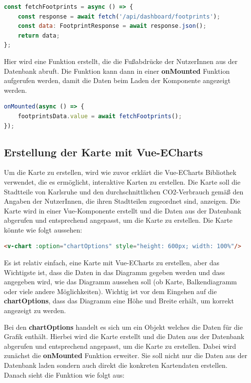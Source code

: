 \begin{lstlisting}[language={JavaScript}, caption={Laden der Fußabdrücke der NutzerInnen}]
const fetchFootprints = async () => {
    const response = await fetch('/api/dashboard/footprints');
    const data: FootprintResponse = await response.json();
    return data;
};
\end{lstlisting}

Hier wird eine Funktion erstellt, die die Fußabdrücke der NutzerInnen aus der Datenbank abruft. Die Funktion kann dann in einer \textbf{onMounted} Funktion aufgerufen werden, damit die Daten beim Laden der Komponente angezeigt werden.

\begin{lstlisting}[language={JavaScript}, caption={Bei laden der Komponente die Fußabdrücke der NutzerInnen speichern}]
onMounted(async () => {
    footprintsData.value = await fetchFootprints();
});
\end{lstlisting}

\subsection{Erstellung der Karte mit Vue-ECharts}

Um die Karte zu erstellen, wird wie zuvor erklärt die Vue-ECharts Bibliothek verwendet, die es ermöglicht, interaktive Karten zu erstellen. Die Karte soll die Stadtteile von Karlsruhe und den durchschnittlichen CO2-Verbrauch gemäß den Angaben der NutzerInnen, die ihren Stadtteilen zugeordnet sind, anzeigen. Die Karte wird in einer Vue-Komponente erstellt und die Daten aus der Datenbank abgerufen und entsprechend angepasst, um die Karte zu erstellen. Die Karte könnte wie folgt aussehen:

\begin{lstlisting}[language={html}, caption={Vue-ECharts Diagramm Beispiel}]
<v-chart :option="chartOptions" style="height: 600px; width: 100%"/>
\end{lstlisting}

Es ist relativ einfach, eine Karte mit Vue-ECharts zu erstellen, aber das Wichtigste ist, dass die Daten in das Diagramm gegeben werden und dass angegeben wird, wie das Diagramm aussehen soll (ob Karte, Balkendiagramm oder viele andere Möglichkeiten). Wichtig ist vor dem Eingehen auf die \textbf{chartOptions}, dass das Diagramm eine Höhe und Breite erhält, um korrekt angezeigt zu werden.

Bei den \textbf{chartOptions} handelt es sich um ein Objekt welches die Daten für die Grafik enthält. Hierbei wird die Karte erstellt und die Daten aus der Datenbank abgerufen und entsprechend angepasst, um die Karte zu erstellen. Dabei wird zunächst die \textbf{onMounted} Funktion erweiter. Sie soll nicht nur die Daten aus der Datenbank laden sondern auch direkt die konkreten Kartendaten erstellen. Danach sieht die Funktion wie folgt aus:

